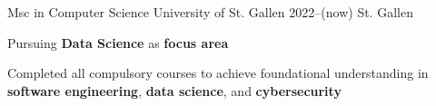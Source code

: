 \begin{cventries}
	\cventry
	{Msc in Computer Science} %
	{University of St. Gallen} %
	{2022--(now)} %
	{St. Gallen} %
	{
		\begin{cvitems} %
			\item {Pursuing \textbf{Data Science} as \textbf{focus area}}
			\item {Completed all compulsory courses to achieve foundational understanding in \textbf{software engineering}, \textbf{data science}, and \textbf{cybersecurity}}
		\end{cvitems}
	}
	{}

\end{cventries}
